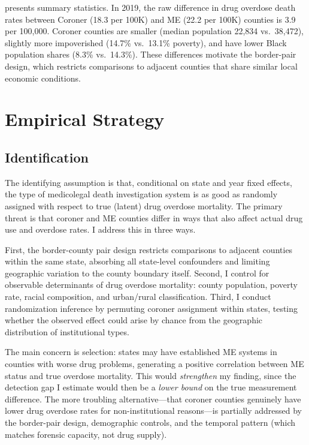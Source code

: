 \documentclass[12pt]{article}
\begin{document}
 presents summary statistics. In 2019, the raw difference in drug overdose death rates between Coroner (18.3 per 100K) and ME (22.2 per 100K) counties is 3.9 per 100,000. Coroner counties are smaller (median population 22,834 vs.\ 38,472), slightly more impoverished (14.7\% vs.\ 13.1\% poverty), and have lower Black population shares (8.3\% vs.\ 14.3\%). These differences motivate the border-pair design, which restricts comparisons to adjacent counties that share similar local economic conditions.



\section{Empirical Strategy}

\subsection{Identification}

The identifying assumption is that, conditional on state and year fixed effects, the type of medicolegal death investigation system is as good as randomly assigned with respect to true (latent) drug overdose mortality. The primary threat is that coroner and ME counties differ in ways that also affect actual drug use and overdose rates. I address this in three ways.

First, the border-county pair design restricts comparisons to adjacent counties within the same state, absorbing all state-level confounders and limiting geographic variation to the county boundary itself. Second, I control for observable determinants of drug overdose mortality: county population, poverty rate, racial composition, and urban/rural classification. Third, I conduct randomization inference by permuting coroner assignment within states, testing whether the observed effect could arise by chance from the geographic distribution of institutional types.

The main concern is selection: states may have established ME systems in counties with worse drug problems, generating a positive correlation between ME status and true overdose mortality. This would \textit{strengthen} my finding, since the detection gap I estimate would then be a \textit{lower bound} on the true measurement difference. The more troubling alternative---that coroner counties genuinely have lower drug overdose rates for non-institutional reasons---is partially addressed by the border-pair design, demographic controls, and the temporal pattern (which matches forensic capacity, not drug supply).
\end{document}
